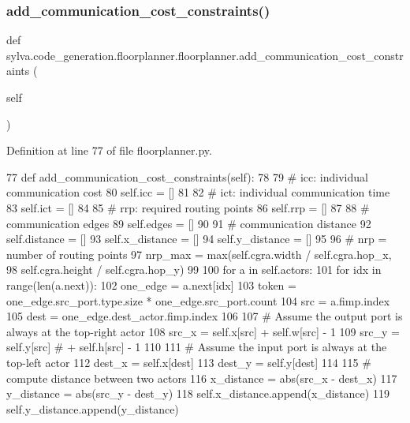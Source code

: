 \subsubsection{\texorpdfstring{add\+\_\+communication\+\_\+cost\+\_\+constraints()}{add\_communication\_cost\_constraints()}}
{\footnotesize\ttfamily def sylva.\+code\+\_\+generation.\+floorplanner.\+floorplanner.\+add\+\_\+communication\+\_\+cost\+\_\+constraints (\begin{DoxyParamCaption}\item[{}]{self }\end{DoxyParamCaption})}



Definition at line 77 of file floorplanner.\+py.


\begin{DoxyCode}
77   \textcolor{keyword}{def }add\_communication\_cost\_constraints(self):
78 
79     \textcolor{comment}{# icc: individual communication cost}
80     self.icc = []
81 
82     \textcolor{comment}{# ict: individual communication time}
83     self.ict = []
84 
85     \textcolor{comment}{# rrp: required routing points}
86     self.rrp = []
87 
88     \textcolor{comment}{# communication edges}
89     self.edges = []
90 
91     \textcolor{comment}{# communication distance}
92     self.distance = []
93     self.x\_distance = []
94     self.y\_distance = []
95 
96     \textcolor{comment}{# nrp = number of routing points}
97     nrp\_max = max(self.cgra.width / self.cgra.hop\_x,
98             self.cgra.height / self.cgra.hop\_y)
99 
100     \textcolor{keywordflow}{for} a \textcolor{keywordflow}{in} self.actors:
101       \textcolor{keywordflow}{for} idx \textcolor{keywordflow}{in} range(len(a.next)):
102         one\_edge = a.next[idx]
103         token = one\_edge.src\_port.type.size * one\_edge.src\_port.count
104         src = a.fimp.index
105         dest = one\_edge.dest\_actor.fimp.index
106 
107         \textcolor{comment}{# Assume the output port is always at the top-right actor}
108         src\_x = self.x[src] + self.w[src] - 1
109         src\_y = self.y[src]  \textcolor{comment}{# + self.h[src] - 1}
110 
111         \textcolor{comment}{# Assume the input port is always at the top-left actor}
112         dest\_x = self.x[dest]
113         dest\_y = self.y[dest]
114 
115         \textcolor{comment}{# compute distance between two actors}
116         x\_distance = abs(src\_x - dest\_x)
117         y\_distance = abs(src\_y - dest\_y)
118         self.x\_distance.append(x\_distance)
119         self.y\_distance.append(y\_distance)

\end{DoxyCode}

